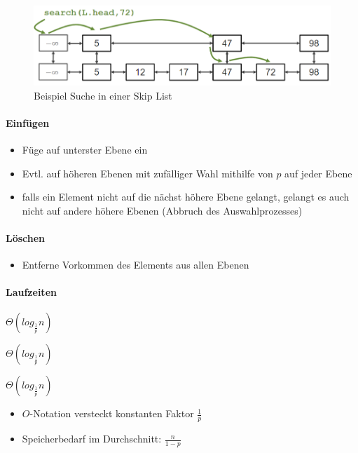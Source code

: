 \documentclass[
    ngerman,
    color=3b,
    load_common, %
    summary,
    boxarc,
]{tuda_summary}
\begin{document}
\begin{figure}[h]
    \centering
    \includegraphics[width=12cm]{pictures/skiplistSuche.PNG}
    \caption{Beispiel Suche in einer Skip List}
\end{figure}
\paragraph{Einfügen}
\begin{itemize}
    \item Füge auf unterster Ebene ein
    \item Evtl. auf höheren Ebenen mit zufälliger Wahl mithilfe von $p$ auf jeder Ebene
    \item falls ein Element nicht auf die nächst höhere Ebene gelangt, gelangt es auch nicht auf andere höhere Ebenen (Abbruch des Auswahlprozesses)
\end{itemize}

\paragraph{Löschen}
\begin{itemize}
    \item Entferne Vorkommen des Elements aus allen Ebenen
\end{itemize}

\paragraph{Laufzeiten}
\begin{description}[leftmargin=2cm]
    \item [Einfügen] $\Theta(log_{\frac{1}{p}}n)$
    \item [Löschen] $\Theta(log_{\frac{1}{p}}n)$
    \item [Suchen] $\Theta(log_{\frac{1}{p}}n)$
\end{description}
\begin{itemize}
    \item $O$-Notation versteckt konstanten Faktor $\frac{1}{p}$
    \item Speicherbedarf im Durchschnitt: $\frac{n}{1-p}$
\end{itemize}
\clearpage
\end{document}
